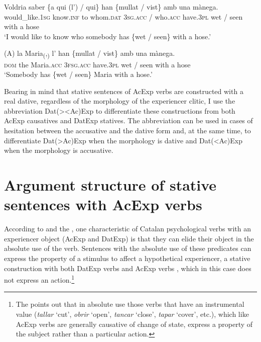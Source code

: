 \documentclass[output=paper,colorlinks,citecolor=brown,modfonts,nonflat]{langsci/langscibook}
\begin{document}
 \ex \label{ex:royo:17d}
 \gll Voldria saber \{a qui (l’) / qui\} han \{mullat / vist\} amb una mànega.\\
 would\_like.\textsc{1sg} know.\textsc{inf} to whom.\textsc{dat} \textsc{3sg.acc} / who.\textsc{acc} have.\textsc{3pl} {\db}wet / seen with a hose\\
\glt ‘I would like to know who somebody has \{wet / seen\} with a hose.’

 \ex \label{ex:royo:17e}
 \gll (A) la Maria\textsubscript{(},\textsubscript{)} l’ han \{mullat / vist\} amb una mànega.\\
 \textsc{dom} the Maria.\textsc{acc} \textsc{3fsg.acc} have.\textsc{3pl} {\db}wet / seen with a hose\\
\glt ‘Somebody has \{wet / seen\} Maria with a hose.’

 \z
 \z

Bearing in mind that stative sentences of AcExp verbs are constructed with a real dative, regardless of the morphology of the experiencer clitic, I use the abbreviation Dat(>{\textbar}<Ac)Exp to differentiate these constructions from both AcExp causatives and DatExp statives. The abbreviation can be used in cases of hesitation between the accusative and the dative form and, at the same time, to differentiate Dat(>Ac)Exp when the morphology is dative and Dat(<Ac)Exp when the morphology is accusative.

\section{Argument structure of stative sentences with AcExp verbs}\label{sec:royo:5}

According to \citet[Sections 13.3.6.2a-b and 13.3.7.2b]{Rossello2008} and the \citet[21.2.2b and 21.5a]{GIEC2016}, one characteristic of Catalan psychological verbs with an experiencer object (AcExp and DatExp) is that they can elide their object in the absolute use of the verb. Sentences with the absolute use of these predicates can express the property of a stimulus to affect a hypothetical experiencer, a stative construction with both DatExp verbs  and AcExp verbs , which in this case does not express an action.\footnote{The \citet[21.2.2b and 21.5a]{GIEC2016} points out that in absolute use those verbs that have an instrumental value (\textit{tallar} ‘cut’, \textit{obrir} ‘open’, \textit{tancar} ‘close’, \textit{tapar} ‘cover’, etc.), which like AcExp verbs are generally causative of change of state, express a property of the subject rather than a particular action.}
\end{document}
